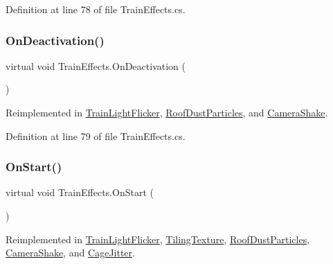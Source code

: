 Definition at line 78 of file Train\+Effects.\+cs.

\mbox{\label{class_train_effects_abc55d7e7440cb7a076c7342c3cf74165}} 
\subsubsection{\texorpdfstring{On\+Deactivation()}{OnDeactivation()}}
{\footnotesize\ttfamily virtual void Train\+Effects.\+On\+Deactivation (\begin{DoxyParamCaption}{ }\end{DoxyParamCaption})\hspace{0.3cm}{\ttfamily [virtual]}}



Reimplemented in \mbox{\hyperlink{class_train_light_flicker_aa1f0646e2c9224f0765ab172515490ee}{Train\+Light\+Flicker}}, \mbox{\hyperlink{class_roof_dust_particles_a06d2c08d9bc936dfbb2c21f9201c84dc}{Roof\+Dust\+Particles}}, and \mbox{\hyperlink{class_camera_shake_a23f08ebfe2391c0f361e2944599c8bfa}{Camera\+Shake}}.



Definition at line 79 of file Train\+Effects.\+cs.

\mbox{\label{class_train_effects_acabdc668bc9a6cf6d8d9e06fa5ccb071}} 
\subsubsection{\texorpdfstring{On\+Start()}{OnStart()}}
{\footnotesize\ttfamily virtual void Train\+Effects.\+On\+Start (\begin{DoxyParamCaption}{ }\end{DoxyParamCaption})\hspace{0.3cm}{\ttfamily [virtual]}}



Reimplemented in \mbox{\hyperlink{class_train_light_flicker_a815f82ff9fe20dc1ea162df8eee0a6cf}{Train\+Light\+Flicker}}, \mbox{\hyperlink{class_tiling_texture_a1af8a5ac35ee619e0fb5db6900d725f6}{Tiling\+Texture}}, \mbox{\hyperlink{class_roof_dust_particles_a9e7b2f81ef7025ae571f03c871b0d4fb}{Roof\+Dust\+Particles}}, \mbox{\hyperlink{class_camera_shake_a564408e38a410303c26ea371f9474496}{Camera\+Shake}}, and \mbox{\hyperlink{class_cage_jitter_a5a4fcbd00fcb23ded787b25ad55ef56c}{Cage\+Jitter}}.



